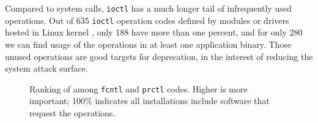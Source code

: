 Compared to system calls, 
{\tt ioctl} has a much longer tail of infrequently used operations.
Out of 635 {\tt ioctl} operation codes defined by modules or drivers hosted in Linux kernel ,
only 188 have \usagemetric{} more than one percent,
and for only 280 we can find usage of the operations in at least one application binary.
Those unused operations are good targets for deprecation, in the interest
of reducing the system attack surface.


\begin{figure}[t]
\vspace{-0.3in}
\caption{Ranking of \usagemetric{} among {\tt fcntl} and {\tt prctl} codes.  Higher is more important; 100\% indicates all installations include software that request the operations.}
\label{fig:fcntl-prctl-popularity}
\end{figure}


